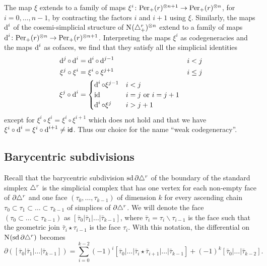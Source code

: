 \begin{remark}
	The map $\xi$ extends to a family of maps $\xi^i\colon \mathrm{Per}_+(r)^{\otimes n+1}\to \mathrm{Per}_+(r)^{\otimes n}$, for $i=0,\ldots,n-1$, by contracting the factors $i$ and $i+1$ using $\xi$. Similarly, the maps $\operatorname{d}^i$ of the cosemi-simplicial structure of $\operatorname{N}_{}(\triangle_{+}^{r})^{\otimes n}$ extend to a family of maps $\operatorname{d}^i\colon \mathrm{Per}_+(r)^{\otimes n}\to \mathrm{Per}_+(r)^{\otimes n+1}$. Interpreting the maps $\xi^i$ as codegeneracies and the maps $\operatorname{d}^i$ as cofaces, we find that they satisfy all the simplicial identities
	\begin{align*}
		\operatorname{d}^j \circ \operatorname{d}^i &= \operatorname{d}^i \circ \operatorname{d}^{j-1} & i &< j \\
		\xi^j \circ \xi^i &= \xi^i \circ \xi^{j+1} & i &\leq j \\
		\xi^j \circ \operatorname{d}^i &= \begin{cases} \operatorname{d}^i \circ \xi^{j-1} & i < j \\ \mathrm{id} & i = j \text{ or } i = j+1 \\ \operatorname{d}^i \circ \xi^j & i > j+1 \end{cases}
	\end{align*}
	except for $\xi^{i}\circ \xi^i = \xi^i\circ \xi^{i+1}$ which does not hold and that we have $\xi^i\circ \operatorname{d}^i = \xi^i\circ \operatorname{d}^{i+1} \neq \mathsf{id}$. Thus our choice for the name ``weak codegeneracy''.
\end{remark}





\subsection{Barycentric subdivisions}\label{s:assembly}

Recall that the barycentric subdivision $\operatorname{sd} \partial\triangle^{r}$ of the boundary of the standard simplex $\triangle^{r}$ is the simplicial complex that has one vertex for each non-empty face of $\partial\triangle^{r}$ and one face $(\tau_0,\dots,\tau_{k-1})$ of dimension $k$ for every ascending chain $\tau_0 \subset \tau_1\subset\dots \subset \tau_{k-1}$ of simplices of $\partial \triangle^{r}$. We will denote the face $(\tau_0 \subset \dots \subset \tau_{k-1})$ as $[\bar{\tau}_0|\bar{\tau}_1|\dots|\bar{\tau}_{k-1}]$, where $\bar{\tau}_i = \tau_i\smallsetminus \tau_{i-1}$ is the face such that the geometric join $\bar{\tau}_i\star \tau_{i-1}$ is the face $\tau_i$. With this notation, the differential on $\operatorname{N}_{}(\operatorname{sd} \partial \triangle^{r})$ becomes
\[
\partial([\bar{\tau}_0|\bar{\tau}_1|\dots|\bar{\tau}_{k-1}]) = \sum_{i=0}^{k-2} (-1)^i[\bar{\tau}_0|\dots|\bar{\tau}_i\star \bar{\tau}_{i+1}|\dots |\bar{\tau}_{k-1}] + (-1)^k [\bar{\tau}_0|\dots|\bar{\tau}_{k-2}].
\]

